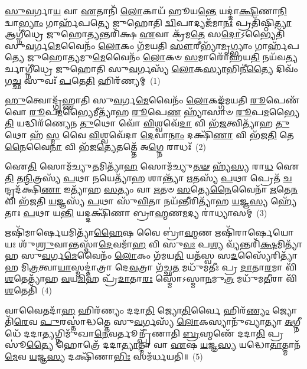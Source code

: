 \setcounter{anuvakam}{0}
\-\ul{𑌸𑍁}\-\-\ul{𑌵}\-𑌰𑍍𑌗𑌾\-\ul{𑌯} 𑌵𑌾 \ul{𑌏}\-𑌤𑌾𑌨𑌿᳴ \ul{𑌲𑍋}\-𑌕𑌾𑌯᳴ 𑌹𑍂𑌯\-\ul{𑌨𑍍𑌤𑍇} 𑌯𑌦𑍍𑌦𑌾॑\-\ul{𑌕𑍍𑌷𑌿}\-𑌣𑌾\-\ul{𑌨𑌿} 𑌦𑍍𑌵𑌾\-\ul{𑌭𑍍𑌯𑌾𑌂} 𑌗𑌾𑌰𑍍\mbox{}𑌹᳴𑌪𑌤𑍍𑌯𑍇 𑌜𑍁𑌹𑍋𑌤𑌿 \ul{𑌦𑍍𑌵𑌿}\-𑌪𑌾𑌦𑍍𑌯𑌜᳴𑌮𑌾\-\ul{𑌨𑌃} 𑌪𑍍𑌰𑌤𑌿᳴𑌷𑍍𑌠𑌿\-\ul{𑌤𑍍𑌯𑌾} 𑌆𑌗𑍍𑌨𑍀॑𑌧𑍍𑌰𑍇 𑌜𑍁𑌹𑍋\-\ul{𑌤𑍍𑌯}\-𑌨𑍍𑌤𑌰𑌿᳴𑌕𑍍𑌷 \ul{𑌏}\-𑌵𑌾 𑌕𑍍𑌰᳴𑌮\-\ul{𑌤𑍇} 𑌸\-\ul{𑌦𑍋}\-\-𑌽𑌭𑍍𑌯𑍈𑌤𑌿᳴ 𑌸𑍁\-\ul{𑌵}\-𑌰𑍍𑌗\-\ul{𑌮𑍇}\-𑌵𑍈𑌨𑌂᳴ \ul{𑌲𑍋}\-𑌕𑌂 𑌗᳴𑌮𑌯𑌤𑌿 \ul{𑌸𑍗}\-𑌰𑍀𑌭𑍍𑌯𑌾᳴\-\ul{𑌮𑍃}\-𑌗𑍍𑌭𑍍𑌯𑌾𑌂 𑌗𑌾𑌰𑍍\mbox{}𑌹᳴𑌪𑌤𑍍𑌯𑍇 𑌜𑍁𑌹𑍋\-\ul{𑌤𑍍𑌯}\-𑌮𑍁\-\ul{𑌮𑍇}\-𑌵𑍈𑌨𑌂᳴ \ul{𑌲𑍋}\-𑌕𑍞 \ul{𑌸}\-𑌮𑌾𑌰𑍋᳴𑌹𑌯\-\ul{𑌤𑌿} 𑌨𑌯᳴𑌵\-\ul{𑌤𑍍𑌯}\-𑌰𑍍𑌚𑌾𑌗𑍍𑌨𑍀॑𑌧𑍍𑌰𑍇 𑌜𑍁𑌹𑍋𑌤𑌿 𑌸𑍁\-\ul{𑌵}\-𑌰𑍍𑌗𑌸𑍍𑌯᳴ \ul{𑌲𑍋}\-𑌕\-\ul{𑌸𑍍𑌯𑌾}\-𑌭𑌿𑌨𑍀॑\-\ul{𑌤𑍍𑌯𑍈} 𑌦𑌿𑌵𑌂᳴ 𑌗\-\ul{𑌚𑍍𑌛} 𑌸𑍁𑌵𑌃᳴ \ul{𑌪}\-𑌤𑍇\-\ul{𑌤𑌿} 𑌹𑌿𑌰᳴𑌣𑍍𑌯𑌮𑍍~(1)

\-\ul{𑌹𑍁}\-𑌤𑍍𑌵𑍋𑌦𑍍𑌗𑍃᳴𑌹𑍍𑌣𑌾𑌤𑌿 𑌸𑍁\-\ul{𑌵}\-𑌰𑍍𑌗\-\ul{𑌮𑍇}\-𑌵𑍈𑌨𑌂᳴ \ul{𑌲𑍋}\-𑌕𑌙𑍍𑌗᳴𑌮𑌯𑌤𑌿 \ul{𑌰𑍂}\-𑌪𑍇𑌣᳴ 𑌵𑍋 \ul{𑌰𑍂}\-𑌪\-\ul{𑌮}\-𑌭𑍍𑌯𑍈𑌮𑍀𑌤𑍍𑌯𑌾᳴𑌹 \ul{𑌰𑍂}\-𑌪𑍇\-\ul{𑌣} 𑌹𑍍𑌯𑌾᳴𑌸𑌾𑍞 \ul{𑌰𑍂}\-𑌪\-\ul{𑌮}\-𑌭𑍍𑌯𑍈\-\ul{𑌤𑌿} 𑌯𑌦𑍍𑌧𑌿𑌰᳴𑌣𑍍𑌯𑍇𑌨 \ul{𑌤𑍁}\-𑌥𑍋 𑌵𑍋᳴ \ul{𑌵𑌿}\-𑌶𑍍𑌵𑌵𑍇᳴\-\ul{𑌦𑌾} 𑌵𑌿 𑌭᳴\-\ul{𑌜}\-𑌤𑍍𑌵𑌿𑌤𑍍𑌯𑌾᳴𑌹 \ul{𑌤𑍁}\-𑌥𑍋 𑌹᳴ \ul{𑌸𑍍𑌮} 𑌵𑍈 \ul{𑌵𑌿}\-𑌶𑍍𑌵𑌵𑍇᳴𑌦𑌾 \ul{𑌦𑍇}\-𑌵𑌾\-\ul{𑌨𑌾𑌂} 𑌦𑌕𑍍𑌷𑌿᳴\-\ul{𑌣𑌾} 𑌵𑌿 𑌭᳴𑌜\-\ul{𑌤𑌿} 𑌤𑍇\-\ul{𑌨𑍈}\-𑌵𑍈\-\ul{𑌨𑌾} 𑌵𑌿 𑌭᳴𑌜\-\ul{𑌤𑍍𑌯𑍇}\-𑌤𑌤𑍍𑌤𑍇᳴ 𑌅\-\ul{𑌗𑍍𑌨𑍇} 𑌰𑌾𑌧𑌃᳴~(2)

𑌐\-\ul{𑌤𑌿} 𑌸𑍋𑌮᳴𑌚𑍍𑌯𑍁\-\ul{𑌤}\-𑌮𑌿𑌤𑍍𑌯𑌾᳴\-\ul{𑌹} 𑌸𑍋𑌮᳴𑌚𑍍𑌯𑍁\-\ul{𑌤}\-\-\ul{𑍟} 𑌹𑍍𑌯᳴\-\ul{𑌸𑍍𑌯} 𑌰𑌾\-\ul{𑌧} 𑌐\-\ul{𑌤𑌿} 𑌤\-\ul{𑌨𑍍𑌮𑌿}\-𑌤𑍍𑌰𑌸𑍍𑌯᳴ \ul{𑌪}\-𑌥𑌾 \ul{𑌨}\-𑌯𑍇𑌤𑍍𑌯𑌾᳴\-\ul{𑌹} 𑌶𑌾𑌨𑍍𑌤𑍍𑌯𑌾᳴ \ul{𑌋}\-𑌤𑌸𑍍𑌯᳴ \ul{𑌪}\-𑌥𑌾 𑌪𑍍𑌰𑍇𑌤᳴ \ul{𑌚}\-𑌨𑍍𑌦𑍍𑌰𑌦᳴𑌕𑍍𑌷𑌿\-\ul{𑌣𑌾} 𑌇𑌤𑍍𑌯𑌾᳴𑌹 \ul{𑌸}\-𑌤𑍍𑌯𑌂 𑌵𑌾 \ul{𑌋}\-𑌤𑍞 \ul{𑌸}\-𑌤𑍍𑌯𑍇\-\ul{𑌨𑍈}\-𑌵𑍈𑌨𑌾᳴ \ul{𑌋}\-𑌤𑍇\-\ul{𑌨} 𑌵𑌿 𑌭᳴𑌜𑌤𑌿 \ul{𑌯}\-𑌜𑍍𑌞𑌸𑍍𑌯᳴ \ul{𑌪}\-𑌥𑌾 𑌸𑍁᳴\-\ul{𑌵𑌿}\-𑌤𑌾 𑌨𑌯᳴\-\ul{𑌨𑍍𑌤𑍀}\-𑌰𑌿𑌤𑍍𑌯𑌾᳴𑌹 \ul{𑌯}\-𑌜𑍍𑌞\-\ul{𑌸𑍍𑌯} 𑌹𑍍𑌯𑍇᳴𑌤𑌾𑌃 \ul{𑌪}\-𑌥𑌾 𑌯\-\ul{𑌨𑍍𑌤𑌿} 𑌯𑌦𑍍𑌦𑌕𑍍𑌷𑌿᳴𑌣𑌾 𑌬𑍍𑌰𑌾\-\ul{𑌹𑍍𑌮}\-𑌣\-\ul{𑌮}\-𑌦𑍍𑌯 𑌰𑌾॑𑌧𑍍𑌯𑌾𑌸𑌮𑍍~(3)

𑌋𑌷𑌿᳴𑌮𑌾𑌰𑍍\mbox{}\-\ul{𑌷𑍇}\-𑌯𑌮𑌿𑌤𑍍𑌯𑌾᳴\-\ul{𑌹𑍈}\-𑌷 𑌵𑍈 𑌬𑍍𑌰𑌾॑\-\ul{𑌹𑍍𑌮}\-𑌣 𑌋𑌷𑌿᳴𑌰𑌾𑌰𑍍\mbox{}\-\ul{𑌷𑍇}\-𑌯𑍋 𑌯𑌃 𑌶𑍁᳴\-\ul{𑌶𑍍𑌰𑍁}\-𑌵𑌾𑌨𑍍𑌤𑌸𑍍𑌮𑌾᳴\-\ul{𑌦𑍇}\-𑌵𑌮𑌾᳴\-\ul{𑌹} 𑌵𑌿 𑌸𑍁\-\ul{𑌵𑌃} 𑌪\-\ul{𑌶𑍍𑌯} 𑌵𑍍𑌯᳴𑌨𑍍𑌤𑌰𑌿᳴\-\ul{𑌕𑍍𑌷}\-𑌮𑌿𑌤𑍍𑌯𑌾᳴𑌹 𑌸𑍁\-\ul{𑌵}\-𑌰𑍍𑌗\-\ul{𑌮𑍇}\-𑌵𑍈𑌨𑌂᳴ \ul{𑌲𑍋}\-𑌕𑌂 𑌗᳴𑌮𑌯\-\ul{𑌤𑌿} 𑌯𑌤᳴𑌸𑍍𑌵 𑌸\-\ul{𑌦}\-𑌸𑍍𑌯𑍈᳴𑌰𑌿𑌤𑍍𑌯𑌾᳴𑌹 𑌮𑌿\-\ul{𑌤𑍍𑌰}\-𑌤𑍍𑌵𑌾\-\ul{𑌯𑌾}\-𑌸𑍍𑌮𑌦𑍍𑌦𑌾॑𑌤𑍍𑌰𑌾 𑌦𑍇\-\ul{𑌵}\-𑌤𑍍𑌰𑌾 𑌗᳴𑌚𑍍𑌛\-\ul{𑌤} 𑌮𑌧𑍁᳴𑌮𑌤𑍀𑌃 𑌪𑍍𑌰 \ul{𑌦𑌾}\-𑌤𑌾\-\ul{𑌰}\-𑌮𑌾 𑌵𑌿᳴\-\ul{𑌶}\-𑌤𑍇𑌤𑍍𑌯𑌾᳴𑌹 \ul{𑌵}\-𑌯\-\ul{𑌮𑌿}\-𑌹 𑌪𑍍𑌰᳴\-\ul{𑌦𑌾}\-𑌤𑌾\-\ul{𑌰𑌃} 𑌸𑍍𑌮𑍋॑\-𑌽𑌸𑍍𑌮𑌾\-\ul{𑌨}\-𑌮𑍁\-\ul{𑌤𑍍𑌰} 𑌮𑌧𑍁᳴𑌮\-\ul{𑌤𑍀}\-𑌰𑌾 𑌵𑌿᳴\-\ul{𑌶}\-𑌤𑍇𑌤𑌿᳴~(4)

𑌵𑌾𑌵𑍈𑌤𑌦𑌾᳴\-\ul{𑌹} 𑌹𑌿𑌰᳴𑌣𑍍𑌯𑌂 𑌦𑌦𑌾\-\ul{𑌤𑌿} 𑌜𑍍𑌯𑍋\-\ul{𑌤𑌿}\-𑌰𑍍𑌵𑍈 𑌹𑌿𑌰᳴\-\ul{𑌣𑍍𑌯𑌂} 𑌜𑍍𑌯𑍋𑌤𑌿᳴\-\ul{𑌰𑍇}\-𑌵 \ul{𑌪𑍁}\-𑌰𑌸𑍍𑌤𑌾॑𑌦𑍍𑌧𑌤𑍍𑌤𑍇 𑌸𑍁\-\ul{𑌵}\-𑌰𑍍𑌗𑌸𑍍𑌯᳴ \ul{𑌲𑍋}\-𑌕𑌸𑍍𑌯𑌾𑌨𑍁᳴𑌖𑍍𑌯𑌾𑌤𑍍𑌯𑌾 \ul{𑌅}\-𑌗𑍍𑌨𑍀𑌧𑍇᳴ 𑌦𑌦𑌾\-\ul{𑌤𑍍𑌯}\-𑌗𑍍𑌨𑌿𑌮𑍁᳴𑌖𑌾\-\ul{𑌨𑍇}\-𑌵𑌰𑍍𑌤𑍂𑌨𑍍𑌪𑍍𑌰𑍀᳴𑌣𑌾𑌤𑌿 \ul{𑌬𑍍𑌰}\-𑌹𑍍𑌮𑌣𑍇᳴ 𑌦𑌦𑌾\-\ul{𑌤𑌿} 𑌪𑍍𑌰𑌸𑍂॑\-\ul{𑌤𑍍𑌯𑍈} 𑌹𑍋𑌤𑍍𑌰𑍇᳴ 𑌦𑌦𑌾\-\ul{𑌤𑍍𑌯𑌾}\-𑌤𑍍𑌮𑌾 𑌵𑌾 \ul{𑌏}\-𑌷 \ul{𑌯}\-𑌜𑍍𑌞\-\ul{𑌸𑍍𑌯} 𑌯𑌦𑍍𑌧𑍋\-\ul{𑌤𑌾}\-𑌤𑍍𑌮𑌾𑌨᳴\-\ul{𑌮𑍇}\-𑌵 \ul{𑌯}\-𑌜𑍍𑌞\-\ul{𑌸𑍍𑌯} 𑌦𑌕𑍍𑌷𑌿᳴𑌣𑌾\-\ul{𑌭𑌿𑌃} 𑌸𑌮᳴𑌰𑍍𑌧𑌯𑌤𑌿॥~(5)

